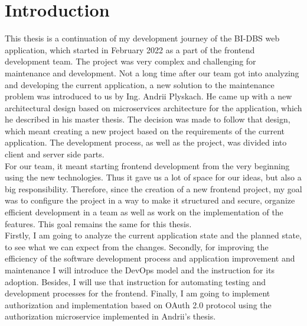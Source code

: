\chapter{Introduction}

This thesis is a continuation of my development journey of the BI-DBS web application, which started in February 2022 as a part of the frontend development team. The project was very complex and challenging for maintenance and development. Not a long time after our team got into analyzing and developing the current application, a new solution to the maintenance problem was introduced to us by Ing. Andrii Plyskach. He came up with a new architectural design based on microservices architecture for the application, which he described in his master thesis\cite{mt-plyskach}. The decision was made to follow that design, which meant creating a new project based on the requirements of the current application. The development process, as well as the project, was divided into client and server side parts.\\
For our team, it meant starting frontend development from the very beginning using the new technologies. Thus it gave us a lot of space for our ideas, but also a big responsibility. Therefore, since the creation of a new frontend project, my goal was to configure the project in a way to make it structured and secure, organize efficient development in a team as well as work on the implementation of the features. This goal remains the same for this thesis.\\
Firstly, I am going to analyze the current application state and the planned state, to see what we can expect from the changes. Secondly, for improving the efficiency of the software development process and application improvement and maintenance I will introduce the DevOps model and the instruction for its adoption. Besides, I will use that instruction for automating testing and development processes for the frontend. Finally, I am going to implement authorization and implementation based on OAuth 2.0 protocol\cite{oauth} using the authorization microservice implemented in Andrii's thesis\cite{mt-plyskach}.
